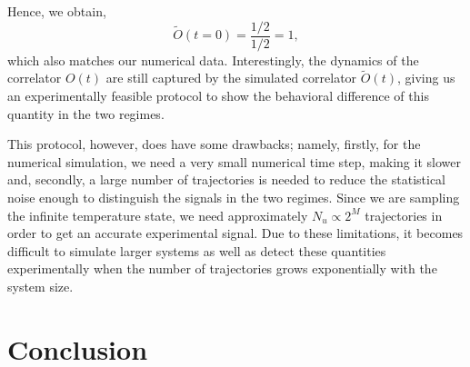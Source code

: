 Hence, we obtain, 
\begin{equation}
    \tilde{O}(t=0) = \frac{1/2}{1/2} = 1, 
\end{equation}
which also matches our numerical data. Interestingly, the dynamics of the correlator $O(t)$ are still captured by the simulated correlator $\tilde{O}(t)$, giving us an experimentally feasible protocol to show the behavioral difference of this quantity in the two regimes. 

This protocol, however, does have some drawbacks; namely, firstly, for the numerical simulation, we need a very small numerical time step, making it slower and, secondly, a large number of trajectories is needed to reduce the statistical noise enough to distinguish the signals in the two regimes. Since we are sampling the infinite temperature state, we need approximately $N_u \propto 2^M$ trajectories in order to get an accurate experimental signal. Due to these limitations, it becomes difficult to simulate larger systems as well as detect these quantities experimentally when the number of trajectories grows exponentially with the system size.

\section{Conclusion}

